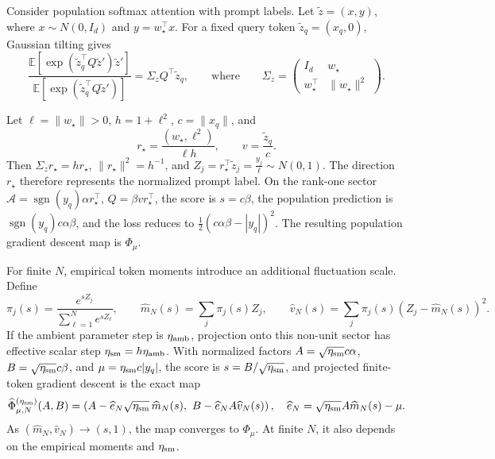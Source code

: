 \documentclass[11pt]{article}
\newcommand{\E}{\mathbb E}
\newcommand{\sgn}{\operatorname{sgn}}
\begin{document}
Consider population softmax attention with prompt labels.  Let
\(\widetilde z=(x,y)\), where \(x\sim N(0,I_d)\) and
\(y=w_\star^\top x\). For a fixed query token
\(\widetilde z_q=(x_q,0)\), Gaussian tilting gives
\begin{equation}
\label{eq:gaussian-softmax}
\frac{\E[\exp(\widetilde z_q^\top Q\widetilde z')\widetilde z']}
     {\E[\exp(\widetilde z_q^\top Q\widetilde z')]}
=\Sigma_z Q^\top\widetilde z_q,
\qquad\text{where}\qquad
\Sigma_z=
\begin{pmatrix}
I_d&w_\star\\
w_\star^\top&\|w_\star\|^2
\end{pmatrix}.
\end{equation}

Let \(\ell=\|w_\star\|>0\), \(h=1+\ell^2\), \(c=\|x_q\|\), and
\[
r_\star=\frac{(w_\star,\ell^2)}{\ell h},\qquad
v=\frac{\widetilde z_q}{c}.
\]
Then \(\Sigma_zr_\star=hr_\star\),
\(\|r_\star\|^2=h^{-1}\), and $Z_j=r_\star^\top\widetilde z_j=\frac{y_j}{\ell}
\sim N(0,1).$ The direction \(r_\star\) therefore represents the normalized
prompt label.  On the
rank-one sector
\(\mathcal A=\sgn(y_q)\alpha r_\star^\top\),
\(Q=\beta vr_\star^\top\), the score is \(s=c\beta\), the population
prediction is \(\sgn(y_q)c\alpha\beta\), and the loss reduces to
\(\frac12(c\alpha\beta-|y_q|)^2\).  The resulting population gradient
descent map is \(\Phi_\mu\).

For finite \(N\), empirical token moments introduce an additional
fluctuation scale.  Define
\[
\pi_j(s)=\frac{e^{sZ_j}}{\sum_{\ell=1}^N e^{sZ_\ell}},\qquad
\widehat m_N(s)=\sum_j\pi_j(s)Z_j,\qquad
\widehat v_N(s)=\sum_j\pi_j(s)(Z_j-\widehat m_N(s))^2.
\]
If the ambient parameter step is \(\eta_{\rm amb}\), projection onto this
non-unit sector has effective scalar step
\(\eta_{\rm sm}=h\eta_{\rm amb}\).  With normalized factors
\(A=\sqrt{\eta_{\rm sm}}c\alpha\),
\(B=\sqrt{\eta_{\rm sm}}c\beta\), and
\(\mu=\eta_{\rm sm}c|y_q|\), the score is
\(s=B/\sqrt{\eta_{\rm sm}}\), and projected finite-token gradient descent is
the exact map
\begin{equation}
\label{eq:finite-softmax-map}
\widehat\Phi_{\mu,N}^{(\eta_{\rm sm})}(A,B)
=
\left(
A-\widehat e_N\sqrt{\eta_{\rm sm}}\,\widehat m_N(s),\
B-\widehat e_N A\widehat v_N(s)
\right),
\quad
\widehat e_N=\sqrt{\eta_{\rm sm}}A\widehat m_N(s)-\mu.
\end{equation}
As \((\widehat m_N,\widehat v_N)\to(s,1)\), the map converges to
\(\Phi_\mu\).  At finite \(N\), it also depends on the empirical moments
and \(\eta_{\rm sm}\).
\end{document}
